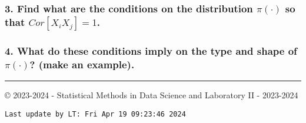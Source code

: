 \documentclass[
]{article}
\begin{document}
\hypertarget{find-what-are-the-conditions-on-the-distribution-picdot-so-that-corx_i-x_j1.}{%
\subsubsection{\texorpdfstring{3. Find what are the conditions on the
distribution \(\pi(\cdot)\) so that
\(Cor[X_i X_j]=1\).}{3. Find what are the conditions on the distribution \textbackslash pi(\textbackslash cdot) so that Cor{[}X\_i X\_j{]}=1.}}\label{find-what-are-the-conditions-on-the-distribution-picdot-so-that-corx_i-x_j1.}}

\hypertarget{what-do-these-conditions-imply-on-the-type-and-shape-of-picdot-make-an-example.}{%
\subsubsection{\texorpdfstring{4. What do these conditions imply on the
type and shape of \(\pi(\cdot)\)? (make an
example).}{4. What do these conditions imply on the type and shape of \textbackslash pi(\textbackslash cdot)? (make an example).}}\label{what-do-these-conditions-imply-on-the-type-and-shape-of-picdot-make-an-example.}}

\vspace{10.5cm}

\begin{center}\rule{0.5\linewidth}{0.5pt}\end{center}

© 2023-2024 - Statistical Methods in Data Science and Laboratory II -
2023-2024

\begin{verbatim}
Last update by LT: Fri Apr 19 09:23:46 2024
\end{verbatim}
\end{document}
